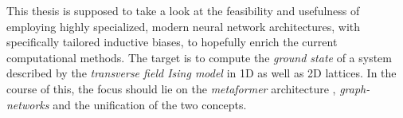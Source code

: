 This thesis is supposed to take a look at the feasibility and usefulness of employing highly specialized, modern neural network architectures, with specifically tailored inductive biases, to hopefully enrich the current computational methods. 
The target is to compute the \emph{ground state} of a system described by the \emph{transverse field Ising model} \cite*[]{isingBook} in 1D as well as 2D lattices.
In the course of this, the focus should lie on the \emph{metaformer} architecture \cite*[]{metaformerPaper}, \emph{graph-networks}\cite*[]{relationalInductiveBiasesAndGraphNetworks} and the unification of the two concepts.
